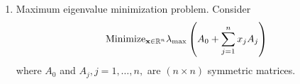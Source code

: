 \begin{enumerate}[label=(\arabic*)]
\begin{align*}
                                                                                          & \iff \begin{pmatrix}
                  x_1        & \mathbf{v}^T  \\
                  \mathbf{v} & x_1 I_{n - 1}
              \end{pmatrix} \succeq 0
          \end{align*}
          where \(\mathbf{v} = \begin{pmatrix}
              x_2 \\ \vdots \\ x_n
          \end{pmatrix}\). This occurs since in both cases \(x_1 = 0\) (then all \(x_2 = \dots = x_n = 0\)) and \(x_1 \neq 0\) (by Schur's complement) the equivalence holds. So, second order cone program is a special semi-definite program with the form
          \begin{align*}
              \text{Minimize}_{X \in S^n} \quad & \sum_{j = 1} c_j X_{1j}                                 \\
              \text{Subject to} \quad           & \sum_{j = 1}^n a_{ij} X_{1j} = b_i, i = 1, \dots, m     \\
                                                & X_{jj} = X_{11}, j = 1, \dots, n                        \\
                                                & X_{jk = 0}, j \neq k, 2 \leq j \leq n, 2 \leq k, \leq n \\
                                                & X = \begin{pmatrix}
                  X_{11} & X_{12} & \cdots & X_{1n} \\
                  X_{12} & X_{22} & \cdots & X_{2n} \\
                  \vdots & \vdots & \ddots & \vdots \\
                  X_{1n} & X_{2n} & \cdots & X_{nn}
              \end{pmatrix} \succeq 0.
          \end{align*}

    \item Maximum eigenvalue minimization problem. Consider
          \[\text{Minimize}_{\mathbf{x} \in \mathbb{R}^n} \lambda_{\max} \left(A_0 + \sum_{j = 1}^n x_j A_j \right)\]
          where \(A_0\) and \(A_j, j = 1, \dots, n,\) are \((n \times n)\) symmetric matrices. \\


\end{enumerate}
